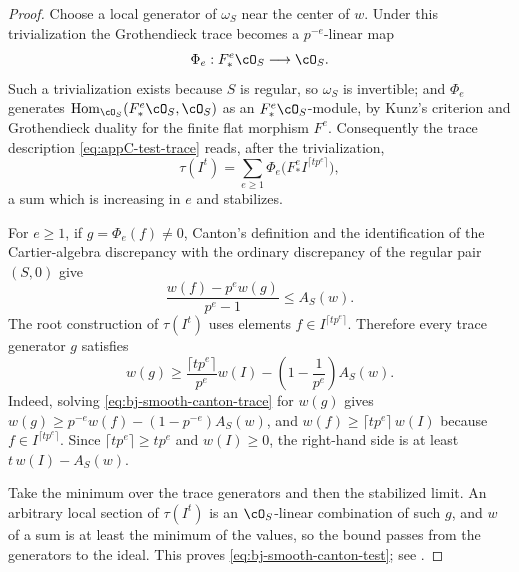 \begin{proof}
Choose a local generator of $\omega_S$ near the center of $w$.  Under
this trivialization the Grothendieck trace becomes a $p^{-e}$-linear map
\[
                         \Phi_e:F_*^e\cO_S\longrightarrow\cO_S.
\]
Such a trivialization exists because $S$ is regular, so $\omega_S$ is
invertible; and $\Phi_e$ generates
$\operatorname{Hom}_{\cO_S}(F^e_*\cO_S,\cO_S)$ as an
$F^e_*\cO_S$-module, by Kunz's criterion and Grothendieck duality for the
finite flat morphism $F^e$.  Consequently the trace description
\eqref{eq:appC-test-trace} reads, after the trivialization,
\[
 \tau(I^t)=\sum_{e\ge1}\Phi_e\bigl(F^e_*I^{\lceil tp^e\rceil}\bigr),
\]
a sum which is increasing in $e$ and stabilizes.

For $e\ge1$, if $g=\Phi_e(f)\ne0$, Canton's definition and the identification of the
Cartier-algebra discrepancy with the ordinary discrepancy of the regular
pair $(S,0)$ give
\[
 \frac{w(f)-p^e w(g)}{p^e-1}
     \le A_S(w).
\tag{40.21}\label{eq:bj-smooth-canton-trace}
\]
The root construction of $\tau(I^t)$ uses elements
$f\in I^{\lceil tp^e\rceil}$.  Therefore every trace generator $g$
satisfies
\[
 w(g)\ge
 \frac{\lceil tp^e\rceil}{p^e}w(I)
 -\left(1-\frac1{p^e}\right)A_S(w).
\]
Indeed, solving \eqref{eq:bj-smooth-canton-trace} for $w(g)$ gives
$w(g)\ge p^{-e}w(f)-(1-p^{-e})A_S(w)$, and
$w(f)\ge\lceil tp^e\rceil\,w(I)$ because
$f\in I^{\lceil tp^e\rceil}$.  Since
$\lceil tp^e\rceil\ge tp^e$ and $w(I)\ge0$, the right-hand side is at
least $t\,w(I)-A_S(w)$.

Take the minimum over the trace generators and then the stabilized limit.
An arbitrary local section of $\tau(I^t)$ is an $\cO_S$-linear
combination of such $g$, and $w$ of a sum is at least the minimum of the
values, so the bound passes from the generators to the ideal.  This proves
\eqref{eq:bj-smooth-canton-test}; see
\cite[Definition~3.3 and Proposition~4.1]{Canton}.
\end{proof}


